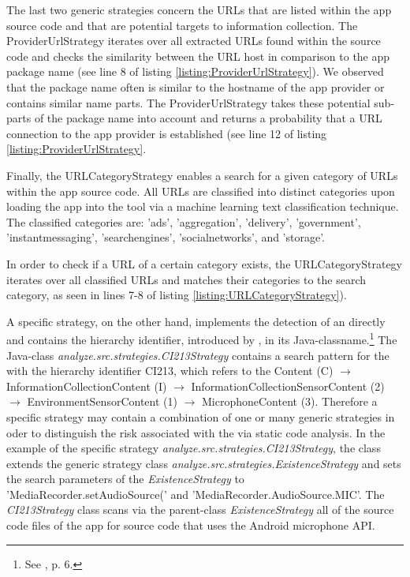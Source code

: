 The last two generic strategies concern the \acs{URL}s that are listed within the app source code and that are potential targets to information collection.
The ProviderUrlStrategy iterates over all extracted URLs found within the source code and checks the similarity between the URL host in comparison to the app package name (see line 8 of listing \ref{listing:ProviderUrlStrategy}).
We observed that the package name often is similar to the hostname of the app provider or contains similar name parts. 
The ProviderUrlStrategy takes these potential sub-parts of the package name into account and returns a probability that a URL connection to the app provider is established (see line 12 of listing \ref{listing:ProviderUrlStrategy}.


Finally, the URLCategoryStrategy enables a search for a given category of URLs within the app source code.
All URLs are classified into distinct categories upon loading the app into the \sca tool via a machine learning text classification technique.
The classified categories are: 'ads', 'aggregation', 'delivery', 'government', 'instantmessaging', 'searchengines', 'socialnetworks', and 'storage'.

In order to check if a URL of a certain category exists, the URLCategoryStrategy iterates over all classified URLs and matches their categories to the search category, as seen in lines 7-8 of listing \ref{listing:URLCategoryStrategy}).


A specific strategy, on the other hand, implements the detection of an \ipp directly and contains the \ipp hierarchy identifier, introduced by \textcite{Dehling2016}, in its Java-classname.\footnote{See \cite{Dehling2016}, p. 6.}
The Java-class \textit{analyze.src.strategies.CI213\textunderscore Strategy} contains a search pattern for the \ipp with the hierarchy identifier CI213, which refers to the \ipp Content (C) $\rightarrow$ InformationCollectionContent (I) $\rightarrow$ InformationCollectionSensorContent (2) $\rightarrow$ EnvironmentSensorContent (1) $\rightarrow$ MicrophoneContent (3).
Therefore a specific strategy may contain a combination of one or many generic strategies in oder to distinguish the risk associated with the \ipp via static code analysis.
In the example of the specific strategy \textit{analyze.src.strategies.CI213\textunderscore Strategy}, the class extends the generic strategy class \textit{analyze.src.strategies.ExistenceStrategy} and sets the search parameters of the \textit{ExistenceStrategy} to 'MediaRecorder.setAudioSource(' and 'MediaRecorder.AudioSource.MIC'.
The \textit{CI213\textunderscore Strategy} class scans via the parent-class \textit{ExistenceStrategy} all of the source code files of the app for source code that uses the Android microphone \acs{API}.

